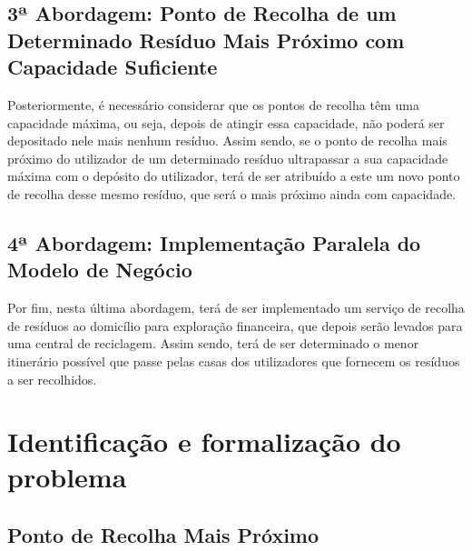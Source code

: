 \documentclass[article, a4paper, 12pt, oneside]{memoir}
\begin{document}
\section[3ª Abordagem: Ponto de Recolha de um Determinado Resíduo Mais Próximo com Capacidade Suficiente][3ª Abordagem: Ponto de Recolha de um Determinado Resíduo Mais Próximo com Capacidade Suficiente]{3ª Abordagem: Ponto de Recolha de um Determinado Resíduo Mais Próximo com Capacidade Suficiente} \label{\thesection}

	
	Posteriormente, é necessário considerar que os pontos de recolha têm uma capacidade máxima, ou seja, depois de atingir essa capacidade, não poderá ser depositado nele mais nenhum resíduo. Assim sendo, se o ponto de recolha mais próximo do utilizador de um determinado resíduo ultrapassar a sua capacidade máxima com o depósito do utilizador, terá de ser atribuído a este um novo ponto de recolha desse mesmo resíduo, que será o mais próximo ainda com capacidade.

\section[4ª Abordagem: Implementação Paralela do Modelo de Negócio][4ª Abordagem: Implementação Paralela do Modelo de Negócio]{4ª Abordagem: Implementação Paralela do Modelo de Negócio} \label{\thesection}
	
	Por fim, nesta última abordagem, terá de ser implementado um serviço de recolha de resíduos ao domicílio para exploração financeira, que depois serão levados para uma central de reciclagem. Assim sendo, terá de ser determinado o menor itinerário possível que passe pelas casas dos utilizadores que fornecem os resíduos a ser recolhidos.



\newpage
\chapter[Identificação e formalização do problema][Identificação e formalização do problema]{Identificação e formalização do problema} \label{\thechapter}

\section{Ponto de Recolha Mais Próximo}
\end{document}
